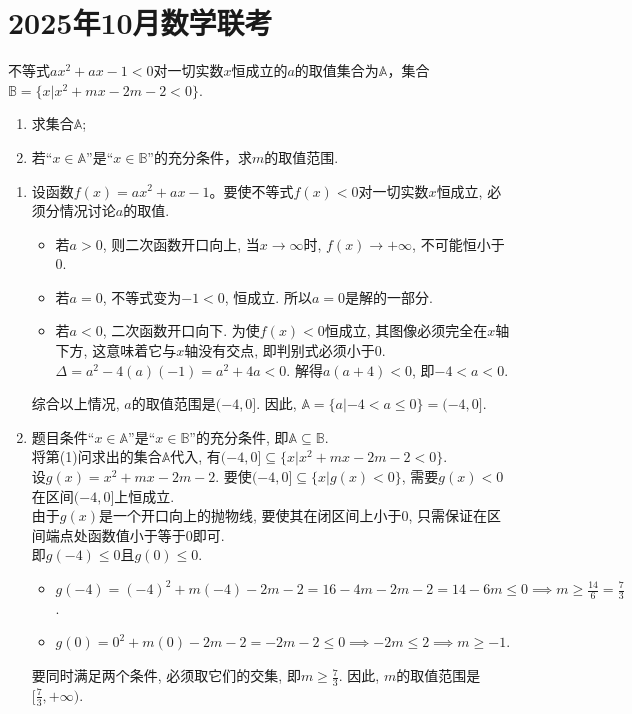 \section{2025年10月数学联考}

\begin{liti}
不等式$ax^2+ax-1<0$对一切实数$x$恒成立的$a$的取值集合为$\mathbb{A}$，集合$\mathbb{B}=\{x|x^2+mx-2m-2<0\}$.
\begin{enumerate}
\item 求集合$\mathbb{A}$;
\item 若“$x\in\mathbb{A}$”是“$x\in\mathbb{B}$”的充分条件，求$m$的取值范围.
\end{enumerate}

\tcblower
\begin{enumerate}
\item 设函数$f(x)=ax^2+ax-1$。要使不等式$f(x)<0$对一切实数$x$恒成立, 必须分情况讨论$a$的取值.
\begin{itemize}
    \item 若$a>0$, 则二次函数开口向上, 当$x\to\infty$时, $f(x)\to+\infty$, 不可能恒小于0.
    \item 若$a=0$, 不等式变为$-1<0$, 恒成立. 所以$a=0$是解的一部分.
    \item 若$a<0$, 二次函数开口向下. 为使$f(x)<0$恒成立, 其图像必须完全在$x$轴下方, 这意味着它与$x$轴没有交点, 即判别式必须小于0.
    $\Delta = a^2 - 4(a)(-1) = a^2+4a < 0$.
    解得$a(a+4)<0$, 即$-4 < a < 0$.
\end{itemize}
综合以上情况, $a$的取值范围是$(-4, 0]$. 因此, $\mathbb{A}=\{a|-4<a\le 0\}=(-4,0]$.

\item 题目条件“$x\in\mathbb{A}$”是“$x\in\mathbb{B}$”的充分条件, 即$\mathbb{A}\subseteq\mathbb{B}$.\\
将第(1)问求出的集合$\mathbb{A}$代入, 有$(-4,0]\subseteq\{x|x^2+mx-2m-2<0\}$.\\
设$g(x)=x^2+mx-2m-2$. 要使$(-4,0]\subseteq\{x|g(x)<0\}$, 需要$g(x)<0$在区间$(-4,0]$上恒成立.\\
由于$g(x)$是一个开口向上的抛物线, 要使其在闭区间上小于0, 只需保证在区间端点处函数值小于等于0即可.\\
即$g(-4)\le 0$且$g(0)\le 0$.
\begin{itemize}
    \item $g(-4) = (-4)^2 + m(-4) - 2m - 2 = 16 - 4m - 2m - 2 = 14 - 6m \le 0 \implies m \ge \frac{14}{6} = \frac{7}{3}$.
    \item $g(0) = 0^2 + m(0) - 2m - 2 = -2m - 2 \le 0 \implies -2m \le 2 \implies m \ge -1$.
\end{itemize}
要同时满足两个条件, 必须取它们的交集, 即$m\ge\frac{7}{3}$.
因此, $m$的取值范围是$[\frac{7}{3}, +\infty)$.
\end{enumerate}
\end{liti}

